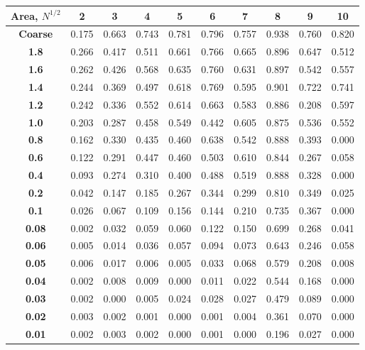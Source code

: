 \documentclass[xcolor={usenames,dvipsnames,svgnames,table}]{beamer}
\begin{document}
\begin{frame}[t]
\begin{table}[H]
{\begin{tabular}{c|c|c|c|c|c|c|c|c|c} 
\bf Area, $N^{1/2}$ & \bf  2 & \bf 3    &  \bf  4   &  \bf  5   &  \bf 6    &  \bf  7   &   \bf 8   &  \bf 9    &  \bf 10   \\ \hline \hline
\bf Coarse& 0.175 & 0.663 & 0.743 & 0.781 & 0.796 & 0.757 & 0.938 & 0.760 & 0.820 \\ \hline 
  \bf 1.8& 0.266 & 0.417 & 0.511 & 0.661 & 0.766 & 0.665 & 0.896 & 0.647 & 0.512 \\ \hline 
  \bf 1.6& 0.262 & 0.426 & 0.568 & 0.635 & 0.760 & 0.631 & 0.897 & 0.542 & 0.557 \\ \hline 
  \bf 1.4& 0.244 & 0.369 & 0.497 & 0.618 & 0.769 & 0.595 & 0.901 & 0.722 & 0.741 \\ \hline 
  \bf 1.2& 0.242 & 0.336 & 0.552 & 0.614 & 0.663 & 0.583 & 0.886 & 0.208 & 0.597 \\ \hline 
  \bf 1.0& 0.203 & 0.287 & 0.458 & 0.549 & 0.442 & 0.605 & 0.875 & 0.536 & 0.552 \\ \hline 
  \bf 0.8& 0.162 & 0.330 & 0.435 & 0.460 & 0.638 & 0.542 & 0.888 & 0.393 & 0.000 \\ \hline 
  \bf 0.6& 0.122 & 0.291 & 0.447 & 0.460 & 0.503 & 0.610 & 0.844 & 0.267 & 0.058 \\ \hline 
  \bf 0.4& 0.093 & 0.274 & 0.310 & 0.400 & 0.488 & 0.519 & 0.888 & 0.328 & 0.000 \\ \hline 
  \bf 0.2& 0.042 & 0.147 & 0.185 & 0.267 & 0.344 & 0.299 & 0.810 & 0.349 & 0.025 \\ \hline 
  \bf 0.1& 0.026 & 0.067 & 0.109 & 0.156 & 0.144 & 0.210 & 0.735 & 0.367 & 0.000 \\ \hline 
  \bf 0.08&0.002 & 0.032 & 0.059 & 0.060 & 0.122 & 0.150 & 0.699 & 0.268 & 0.041 \\ \hline 
  \bf 0.06&0.005 & 0.014 & 0.036 & 0.057 & 0.094 & 0.073 & 0.643 & 0.246 & 0.058 \\ \hline 
  \bf 0.05&0.006 & 0.017 & 0.006 & 0.005 & 0.033 & 0.068 & 0.579 & 0.208 & 0.008 \\ \hline 
  \bf 0.04&0.002 & 0.008 & 0.009 & 0.000 & 0.011 & 0.022 & 0.544 & 0.168 & 0.000 \\ \hline 
  \bf 0.03&0.002 & 0.000 & 0.005 & 0.024 & 0.028 & 0.027 & 0.479 & 0.089 & 0.000 \\ \hline 
  \bf 0.02&0.003 & 0.002 & 0.001 & 0.000 & 0.001 & 0.004 & 0.361 & 0.070 & 0.000 \\ \hline 
  \bf 0.01&0.002 & 0.003 & 0.002 & 0.000 & 0.001 & 0.000 & 0.196 & 0.027 & 0.000 \\ \hline 

\end{tabular}}
\label{all_improvements}
\end{table}
\end{frame}
\end{document}
